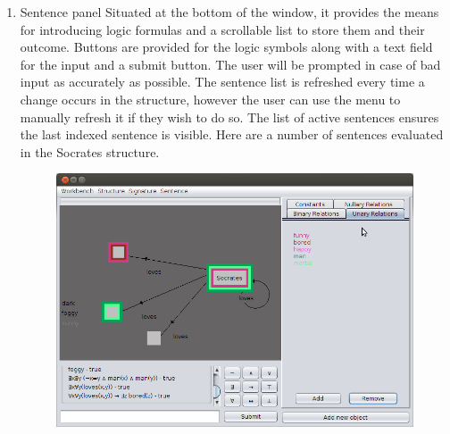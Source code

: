 \documentclass{report}
\begin{document}
\begin{enumerate}
\item Sentence panel
Situated at the bottom of the window, it provides the means for introducing 
logic formulas and a scrollable list to store them and their outcome. Buttons 
are provided for the logic symbols along with a text field for the input and a 
submit button. The user will be prompted in case of bad input as accurately as 
possible. The sentence list is refreshed every time a change occurs in the 
structure, however the user can use the menu to manually refresh it if they 
wish to do so. The list of active sentences ensures the last indexed sentence 
is visible. Here are a number of sentences evaluated in the Socrates structure. 
\begin{figure}[h!]
\includegraphics[scale=0.5]{socratesSentences.png}
\end{figure}
\end{enumerate}
\end{document}
